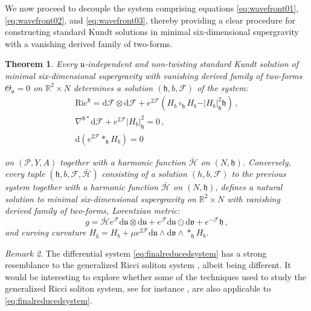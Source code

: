 \documentclass[10pt,a4paper,twoside,reqno]{amsart}
\theoremstyle{plain}
\newtheorem{thm}{Theorem}[section]
\theoremstyle{definition}
\theoremstyle{remark}
\newtheorem{remark}[thm]{Remark}
\def\dd{\mathrm{d}}
\def\cH{\mathcal{H}}
\def\cP{\mathcal{P}}
\def\cP{\mathcal{P}}
\def\cF{\mathcal{F}}
\def\cH{\mathcal{H}}
\def\dd{\mathrm{d}}
\def\fru{\mathfrak{u}}
\def\frv{\mathfrak{v}}
\begin{document}
\noindent
We now proceed to decouple the system comprising equations \eqref{eq:wavefront01}, \eqref{eq:wavefront02}, and \eqref{eq:wavefront03}, thereby providing a clear procedure for constructing standard Kundt solutions in minimal six-dimensional supergravity with a vanishing derived family of two-forms.

\begin{thm}
\label{thm:finalreducedsystem}
Every $\fru$-independent and non-twisting standard Kundt solution of minimal six-dimen\-sional supergravity with vanishing derived family of two-forms $\Theta_{\fru} = 0$ on $\mathbb{R}^2\times N$ determines a solution $(\mathfrak{h},b,\cF)$ of the system:
\begin{equation}\label{eq:finalreducedsystem}
\begin{gathered}
\mathrm{Ric}^{\mathfrak{h}} = \dd\cF \otimes \dd\cF +  e^{2\cF} (H_b\circ_{\mathfrak{h}} H_b -  \vert H_b \vert^2_{\mathfrak{h}}\mathfrak{h} )\, ,\\
\nabla^{\mathfrak{h}\ast}\dd \cF  + e^{2\cF} \vert H_b \vert^2_{\mathfrak{h}} = 0\, ,\\
\dd (e^{2\cF} \ast_{\mathfrak{h}} H_b) = 0
\end{gathered}
\end{equation}

\noindent
on $(\cP,Y,A)$ together with a harmonic function $\bar{\cH}$ on $(N,\mathfrak{h})$. Conversely, every tuple $(\mathfrak{h},b,\cF,\bar{\cH})$ consisting of a solution $(h,b,\cF)$ to the previous system together with a harmonic function $\bar{\cH}$ on $(N,\mathfrak{h})$, defines a natural solution to minimal six-dimensional supergravity on $\mathbb{R}^2 \times N$ with vanishing derived family of two-forms, Lorentzian metric: 
\begin{equation*}
g =  \bar{\cH} e^{\cF} \dd\fru\otimes \dd\fru +  e^{\cF} \dd \fru\odot \dd \frv + e^{-\cF} \mathfrak{h}\, ,
\end{equation*}
and curving curvature $H_{\bar{b}} = H_b + \mu e^{2\cF} \dd\fru \wedge \dd\frv \wedge \ast_{\mathfrak{h}} H_b$.
\end{thm}

\begin{remark}
The differential system \eqref{eq:finalreducedsystem} has a strong resemblance to the generalized Ricci soliton system \cite{MarioStreets}, albeit being different. It would be interesting to explore whether some of the techniques used to study the generalized Ricci soliton system, see for instance \cite{StreetsI,StreetsUstinovskiy,StreetsUstinovskiyII}, are also applicable to \eqref{eq:finalreducedsystem}.
\end{remark}
\end{document}
